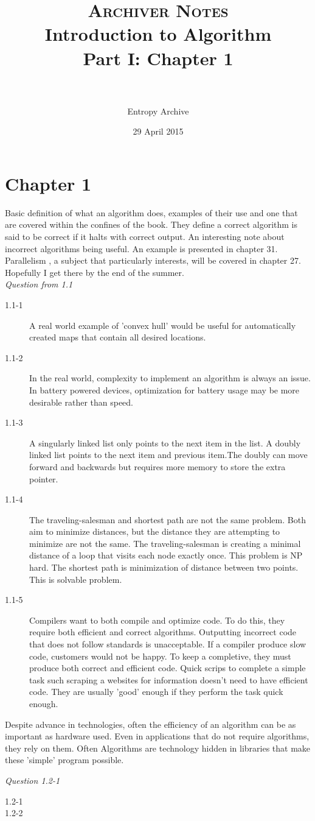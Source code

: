 \documentclass{article}
\title{
    \normalfont \normalsize
    \textsc{Archiver Notes} 
    \horrule{0.5pt} \\
    \huge Introduction to Algorithm \\
    \small Part I: Chapter 1\\
    \horrule{2pt} \\
}
\author{Entropy Archive}
\date{\normalsize 29 April 2015}
\begin{document}
\maketitle
\section*{Chapter 1}
Basic definition of what an algorithm does, examples of their use and one that
are covered within the confines of the book. They define a correct algorithm is
said to be correct if it halts with correct output. An interesting note about
incorrect algorithms being useful. An example is presented in chapter 31.
Parallelism , a subject that particularly interests, will be covered in chapter
27. Hopefully I get there by the end of the summer.\\ 

\textit{Question from 1.1}
\begin{description}
\item[1.1-1] 
A real world example of 'convex hull' would be useful for automatically created
maps that contain all desired locations. 
\item[1.1-2]
In the real world, complexity to implement an algorithm is always an issue. In
battery powered devices, optimization for battery usage may be more desirable
rather than speed.   
\item[1.1-3] A singularly linked list only points to the next item in the list.
A doubly linked list points to the next item and previous item.The doubly can
move forward and backwards but requires more memory to store the extra pointer.
\item[1.1-4] The traveling-salesman and shortest path are not the same problem.
Both aim to minimize distances, but the distance they are attempting to
minimize are not the same. The traveling-salesman is creating a minimal
distance of a loop that visits each node exactly once. This problem is NP hard.
The shortest path is minimization of distance between two points. This is
solvable problem. 
\item[1.1-5] Compilers want to both compile and optimize code. To do this, they
require both efficient and correct algorithms. Outputting incorrect code that
does not follow standards is unacceptable. If a compiler produce slow code,
customers would not be happy. To keep a completive, they must produce both
correct and efficient code. Quick scrips to complete a simple task such
scraping a websites for information doesn't need to have efficient code. They
are usually 'good' enough if they perform the task quick enough.    
\end{description}

Despite advance in technologies, often the efficiency of an algorithm can be as
important as hardware used. Even in applications that do not require
algorithms, they rely on them. Often Algorithms are technology hidden in
libraries that make these 'simple' program possible. 

\textit{Question 1.2-1}
\begin{description}
\item[1.2-1]

\item[1.2-2]
\end{description}
\end{document}
